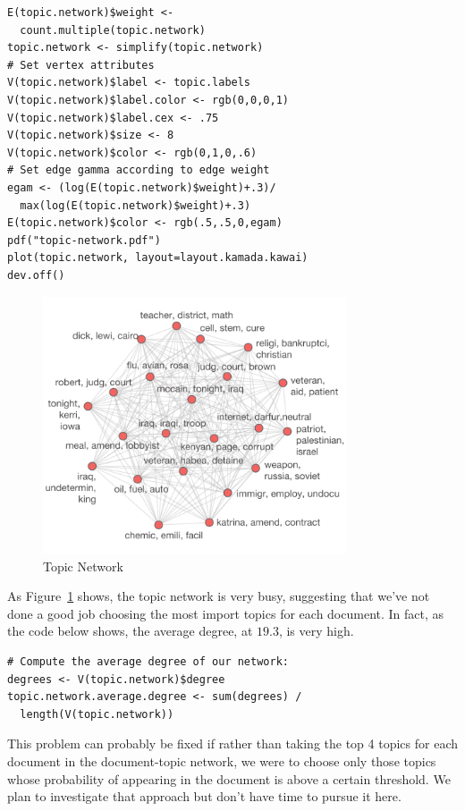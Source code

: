 \documentclass[%
	final,
	notitlepage,
	narroweqnarray,
	inline,
	]{ieee}
\begin{document}
\begin{verbatim}
E(topic.network)$weight <- 
  count.multiple(topic.network)
topic.network <- simplify(topic.network)
# Set vertex attributes
V(topic.network)$label <- topic.labels
V(topic.network)$label.color <- rgb(0,0,0,1)
V(topic.network)$label.cex <- .75
V(topic.network)$size <- 8
V(topic.network)$color <- rgb(0,1,0,.6)
# Set edge gamma according to edge weight
egam <- (log(E(topic.network)$weight)+.3)/
  max(log(E(topic.network)$weight)+.3)
E(topic.network)$color <- rgb(.5,.5,0,egam)
pdf("topic-network.pdf")
plot(topic.network, layout=layout.kamada.kawai)
dev.off()
\end{verbatim}


\begin{figure}
\centering
\includegraphics[width=90mm]{topic-network.pdf}
\caption{Topic Network}
\label{fig:topic-network}
\end{figure}

As Figure~\ref{fig:topic-network} shows, the topic network is very busy, suggesting
that we've not done a good job choosing the most import topics for each document.
In fact, as the code below shows, the average degree, at $19.3$, is very high.

\begin{verbatim}
# Compute the average degree of our network:
degrees <- V(topic.network)$degree
topic.network.average.degree <- sum(degrees) / 
  length(V(topic.network))
\end{verbatim}

\noindent This problem can probably be fixed if rather than taking the top 4 topics for each
document in the document-topic network, we were to choose only those topics whose
probability of appearing in the document is above a certain threshold.  We plan to 
investigate that approach but don't have time to pursue it here.
\end{document}

